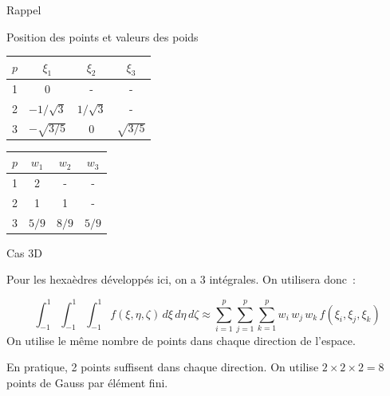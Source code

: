 \documentclass[
mode=present,    %
paper=a4paper,   %
orient=landscape,
display=slides,   %
size=10pt,     %
style=romain   %
]{powerdot}
\begin{document}
\begin{slide}[toc=]{Rappel}

Position des points et valeurs des poids

\begin{center}
\begin{tabular}{|c|c|c|c|}
  \hline
  $p$  & $\xi_1$ & $\xi_2$ & $\xi_3$ \\ \hline
  1 & 0 & - & - \\
  2 & $-1/\sqrt{3}$ & $1/\sqrt{3}$ & - \\
  3 & $-\sqrt{3/5}$ & 0 & $\sqrt{3/5}$ \\
  \hline
\end{tabular}
\end{center}


\begin{center}
\begin{tabular}{|c|c|c|c|}
  \hline
  $p$  & $w_1$ & $w_2$ & $w_3$ \\ \hline
  1 & 2 & - & - \\
  2 & 1 & 1 & - \\
  3 & $5/9$ & $8/9$ & $5/9$ \\
  \hline
\end{tabular}
\end{center}

\end{slide}





\begin{slide}{Cas 3D}

Pour les hexaèdres développés ici, on a 3 intégrales. On utilisera donc~:

\begin{equation*}
    \int_{-1}^1\int_{-1}^1\int_{-1}^1 f(\xi,\eta,\zeta) \,d\xi\,d\eta\,d\zeta
    \approx
    \sum_{i=1}^p\sum_{j=1}^p\sum_{k=1}^p
    w_i\,w_j\,w_k\, f(\xi_i,\xi_j,\xi_k)
\end{equation*}
On utilise le même nombre de points dans chaque direction de l'espace.

\bigskip

En pratique, 2 points suffisent dans chaque direction.
On utilise $2\times 2\times 2=8$ points de Gauss par élément fini.

\end{slide}
\end{document}
